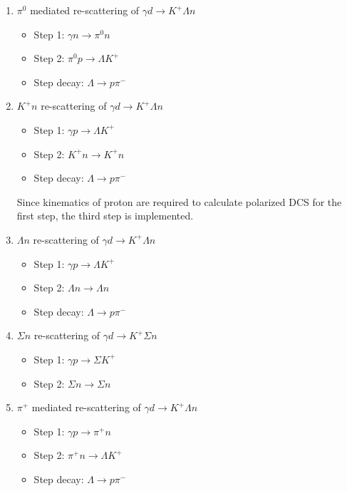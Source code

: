 \documentclass[a4paper]{article}
\begin{document}
\begin{enumerate}
\item $\pi^0$ mediated re-scattering of $\gamma d\rightarrow K^+\Lambda n$
  \begin{itemize}
  \item Step 1: $\gamma n\rightarrow \pi^0 n$
  \item Step 2: $\pi^0 p\rightarrow \Lambda K^+$
  \item Step decay: $\Lambda\rightarrow p \pi^-$
  \end{itemize}

\item $K^+ n$ re-scattering of $\gamma d\rightarrow K^+\Lambda n$
  \begin{itemize}
  \item Step 1: $\gamma p\rightarrow  \Lambda K^+$
  \item Step 2: $K^+ n\rightarrow K^+ n$
  \item Step decay: $\Lambda\rightarrow p \pi^-$
  \end{itemize}

Since kinematics of proton are required to calculate polarized DCS for the first step, the third step is implemented.

\item $\Lambda n$ re-scattering of $\gamma d\rightarrow K^+\Lambda n$
  \begin{itemize}
  \item Step 1: $\gamma p\rightarrow \Lambda K^+$ 
  \item Step 2: $\Lambda n\rightarrow \Lambda n$
  \item Step decay: $\Lambda\rightarrow p \pi^-$
  \end{itemize}

\item $\Sigma n$ re-scattering of $\gamma d\rightarrow K^+\Sigma n$
  \begin{itemize}
  \item Step 1: $\gamma p\rightarrow \Sigma K^+ $
  \item Step 2: $\Sigma n\rightarrow \Sigma n$
  \end{itemize}

\item $\pi^+$ mediated re-scattering of $\gamma d\rightarrow K^+\Lambda n$
  \begin{itemize}
  \item Step 1: $\gamma p\rightarrow \pi^+ n$
  \item Step 2: $\pi^+ n\rightarrow \Lambda K^+$
  \item Step decay: $\Lambda\rightarrow p \pi^-$
  \end{itemize}


\end{enumerate}
\end{document}

